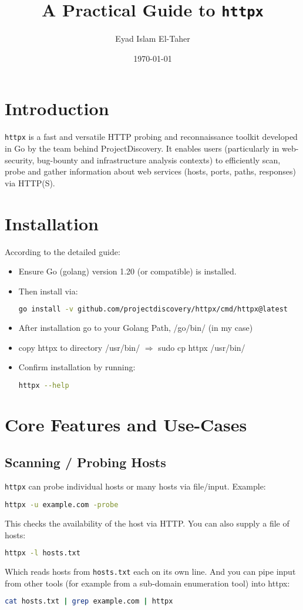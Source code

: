 \documentclass[11pt,a4paper]{article}
\title{A Practical Guide to \texttt{httpx}}
\author{Eyad Islam El-Taher}
\date{\today}
\begin{document}
\maketitle

\section*{Introduction}
\texttt{httpx} is a fast and versatile HTTP probing and reconnaissance toolkit developed in Go by the team behind ProjectDiscovery.  
It enables users (particularly in web-security, bug-bounty and infrastructure analysis contexts) to efficiently scan, probe and gather information about web services (hosts, ports, paths, responses) via HTTP(S).  


\section*{Installation}
According to the detailed guide:  
\begin{itemize}
  \item Ensure Go (golang) version 1.20 (or compatible) is installed.
  \item Then install via:  
\begin{lstlisting}[language=bash]
go install -v github.com/projectdiscovery/httpx/cmd/httpx@latest
\end{lstlisting}
  \item After installation go to your Golang Path, /go/bin/ (in my case)
  \item copy httpx to directory /usr/bin/ $\Rightarrow$ sudo cp httpx /usr/bin/
  \item Confirm installation by running:  
\begin{lstlisting}[language=bash]
httpx --help
\end{lstlisting}
\end{itemize}

\section*{Core Features and Use-Cases}
\subsection*{Scanning / Probing Hosts}
\texttt{httpx} can probe individual hosts or many hosts via file/input. Example:  
\begin{lstlisting}[language=bash]
httpx -u example.com -probe
\end{lstlisting}
This checks the availability of the host via HTTP.
You can also supply a file of hosts:  
\begin{lstlisting}[language=bash]
httpx -l hosts.txt
\end{lstlisting}
Which reads hosts from \texttt{hosts.txt} each on its own line.
And you can pipe input from other tools (for example from a sub-domain enumeration tool) into httpx:  
\begin{lstlisting}[language=bash]
cat hosts.txt | grep example.com | httpx
\end{lstlisting}
\end{document}

